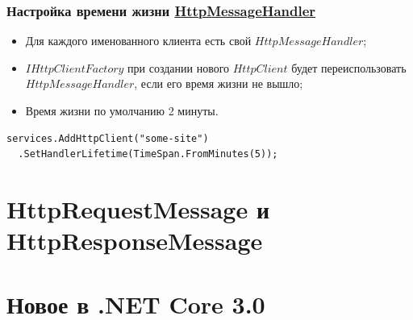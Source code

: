 \documentclass{beamer}
\begin{document}
\begin{frame}[fragile]
\frametitle{Настройка времени жизни \href{https://docs.microsoft.com/en-us/dotnet/api/system.net.http.socketshttphandler?view=netcore-2.2}{HttpMessageHandler}}
\begin{itemize}
\item Для каждого именованного клиента есть свой $HttpMessageHandler$;
\item $IHttpClientFactory$ при создании нового $HttpClient$ будет переиспользовать $HttpMessageHandler$, если его время жизни не вышло;
\item Время жизни по умолчанию 2 минуты.
\end{itemize}
\begin{lstlisting}
services.AddHttpClient("some-site")
  .SetHandlerLifetime(TimeSpan.FromMinutes(5));
\end{lstlisting}
\end{frame}


\section{HttpRequestMessage и HttpResponseMessage}
\begin{frame}
\end{frame}

\section{Новое в .NET Core 3.0}
\begin{frame}
\end{frame}
\end{document}
